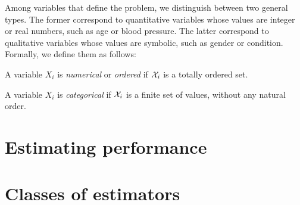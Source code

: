 Among variables that define the problem, we distinguish between two general
types. The former correspond to quantitative variables whose values are integer
or real numbers, such as age or blood pressure. The latter correspond to
qualitative variables whose values are symbolic, such as gender or condition.
Formally, we define them as follows:

\begin{definition}
A variable $X_i$ is \emph{numerical} or \emph{ordered} if ${\cal X}_i$ is a
totally ordered set.
\end{definition}

\begin{definition}
A variable $X_i$ is \emph{categorical} if ${\cal X}_i$ is a finite set of values,
without any natural order.
\end{definition}








\section{Estimating performance}


\section{Classes of estimators}
